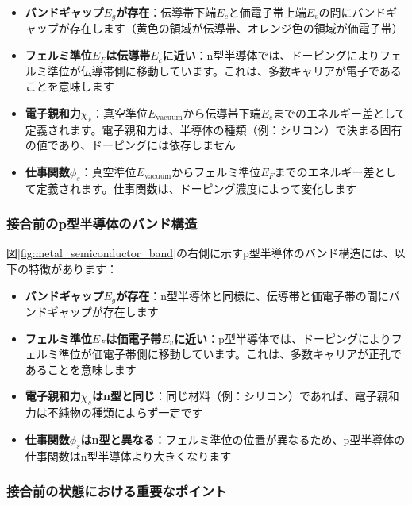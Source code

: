 \begin{itemize}
\item \textbf{バンドギャップ$E_g$が存在}：伝導帯下端$E_c$と価電子帯上端$E_v$の間にバンドギャップが存在します（黄色の領域が伝導帯、オレンジ色の領域が価電子帯）

\item \textbf{フェルミ準位$E_F$は伝導帯$E_c$に近い}：n型半導体では、ドーピングによりフェルミ準位が伝導帯側に移動しています。これは、多数キャリアが電子であることを意味します

\item \textbf{電子親和力$\chi_s$}：真空準位$E_{\text{vacuum}}$から伝導帯下端$E_c$までのエネルギー差として定義されます。電子親和力は、半導体の種類（例：シリコン）で決まる固有の値であり、ドーピングには依存しません

\item \textbf{仕事関数$\phi_s$}：真空準位$E_{\text{vacuum}}$からフェルミ準位$E_F$までのエネルギー差として定義されます。仕事関数は、ドーピング濃度によって変化します
\end{itemize}

\subsubsection{接合前のp型半導体のバンド構造}

図\ref{fig:metal_semiconductor_band}の右側に示すp型半導体のバンド構造には、以下の特徴があります：

\begin{itemize}
\item \textbf{バンドギャップ$E_g$が存在}：n型半導体と同様に、伝導帯と価電子帯の間にバンドギャップが存在します

\item \textbf{フェルミ準位$E_F$は価電子帯$E_v$に近い}：p型半導体では、ドーピングによりフェルミ準位が価電子帯側に移動しています。これは、多数キャリアが正孔であることを意味します

\item \textbf{電子親和力$\chi_s$はn型と同じ}：同じ材料（例：シリコン）であれば、電子親和力は不純物の種類によらず一定です

\item \textbf{仕事関数$\phi_s$はn型と異なる}：フェルミ準位の位置が異なるため、p型半導体の仕事関数はn型半導体より大きくなります
\end{itemize}

\subsubsection{接合前の状態における重要なポイント}

